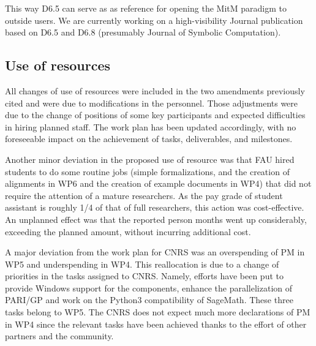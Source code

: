 This way D6.5 can serve as as reference for opening the MitM paradigm to outside users. We
are currently working on a high-visibility Journal publication based on D6.5 and D6.8
(presumably Journal of Symbolic Computation). 

\subsection{Use of resources}

All changes of use of resources were included in the two amendments previously cited and were
due to modifications in the personnel. Those adjustments were due to the change of positions
of some key \ODK participants and expected difficulties in hiring planned
staff. The work plan has been updated accordingly, with no foreseeable
impact on the achievement of tasks, deliverables, and milestones.

Another minor deviation in the proposed use of resource was that FAU hired students to do
some routine jobs (simple formalizations, and the creation of alignments in WP6 and the
creation of example documents in WP4) that did not require the attention of a mature
researchers. As the pay grade of student assistant is roughly 1/4 of that of full
researchers, this action was cost-effective. An unplanned effect was that the reported
person months went up considerably, exceeding the planned amount, without incurring
additional cost. 


A major deviation from the work plan for CNRS was an overspending of PM in WP5 and
underspending in WP4. This reallocation is due to a change of priorities in the tasks
assigned to CNRS. Namely, efforts have been put to provide Windows support for
the \DOK components, enhance the parallelization of PARI/GP and work on the Python3
compatibility of SageMath. These three tasks belong to WP5. The CNRS does not expect
much more declarations of PM in WP4 since the relevant tasks have been achieved
thanks to the effort of other \ODK partners and the community.


